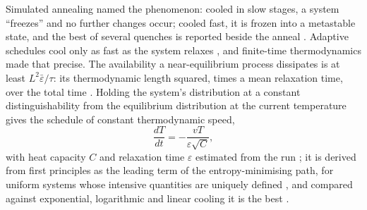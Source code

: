 \documentclass[11pt]{article}
\begin{document}
Simulated annealing named the phenomenon: cooled in slow stages, a system ``freezes'' and no further
changes occur; cooled fast, it is frozen into a metastable state, and the best of several quenches is
reported beside the anneal \citep{kirkpatrick-1983-optimization-by-simulated-annealing}. Adaptive
schedules cool only as fast as the system relaxes
\citep{huang-1986-efficient-cooling-schedule,romeo-1989-simulated-annealing-theory-layout}, and
finite-time thermodynamics made that precise. The availability a near-equilibrium process dissipates
is at least $L^2 \bar\varepsilon / \tau$: its thermodynamic length squared, times a mean relaxation
time, over the total time \citep{salamon-1983-thermodynamic-length-dissipated-availability}. Holding
the system's distribution at a constant distinguishability from the equilibrium distribution at the
current temperature gives the schedule of constant thermodynamic speed,
\begin{equation}
\frac{dT}{dt} = -\frac{vT}{\varepsilon\sqrt{C}},
\end{equation}
with heat capacity $C$ and relaxation time $\varepsilon$ estimated from the run
\citep{nulton-1988-statistical-mechanics-combinatorial-optimization,salamon-1988-simulated-annealing-constant-thermodynamic-speed};
it is derived from first principles as the leading term of the entropy-minimising path, for uniform
systems whose intensive quantities are uniquely defined
\citep{andresen-1993-constant-thermodynamic-speed-cooling,andresen-1994-constant-thermodynamic-speed-entropy-production},
and compared against exponential, logarithmic and linear cooling it is the best
\citep{nourani-1998-comparison-annealing-cooling-strategies}.
\end{document}
